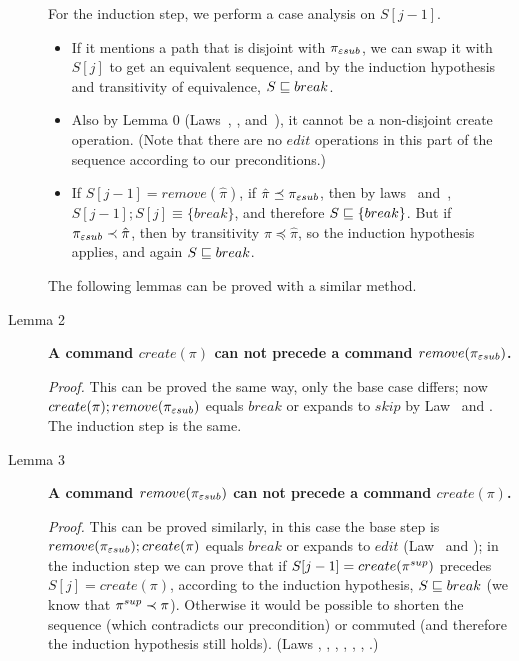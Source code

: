 \begin{description}
For the induction step, we perform a case analysis on \(S[j-1]\).
\begin{itemize}
\item
If it mentions a path that is disjoint with \(\pi_{\varepsilon sub}\),
we can swap it
with \(S[j]\) to get an equivalent sequence, and by the induction   
hypothesis and transitivity of equivalence, \(S\sqsubseteq break\).
\item
Also by Lemma 0 (Laws~\lawxvi, \lawxvii, and~\lawxxvii), it cannot be a
non-disjoint create operation. (Note that there are no \(edit\) operations
in this part of the sequence according to our preconditions.)
\item
If $S[j-1] =remove(\hat\pi)$, if $\hat\pi \preceq \pi_{\varepsilon sub}$, then by laws
\lawxxii~and~\lawxxiii, $S[j-1]; S[j] \equiv \{break\}$, and therefore 
$S\sqsubseteq\{break\}$.
But if $\pi_{\varepsilon sub} \prec \hat\pi$, then by transitivity $\pi \preceq
\hat\pi$, so the induction hypothesis applies, and again 
$S \sqsubseteq break$.
\end{itemize}

\begin{forrsi}
The following lemmas can be proved with a similar method.
\end{forrsi}
\item[Lemma 2]
{\bf A command \(create(\pi)\) can not precede a command  
\(remove(\pi_{\varepsilon sub})\).} 
\begin{notrsi}
\emph{Proof.} 
This can be proved the same way, only
the base case differs; now 
\(create(\pi); remove({\pi_{\varepsilon sub}})\) equals \(break\) or expands 
to \(skip\) by Law \lawxvi~and \lawxxvii.
The induction step is the same.
\end{notrsi}

\item[Lemma 3]
{\bf A command \(remove(\pi_{\varepsilon sub})\) can not precede a command
\(create(\pi)\).} 
\begin{notrsi}
\emph{Proof.} This can be proved similarly, in this 
case the base step is
\(remove(\pi_{\varepsilon sub}); create({\pi})\) equals \(break\) or
expands to \(edit\) (Law \lawxxi~and \lawxxviii);
in the induction step we can prove that if
\(S[j-1]=create(\pi^{sup})\) precedes \(S[j]=create(\pi)\), according to
the induction hypothesis, \(S\sqsubseteq break\) 
(we know that \(\pi^{sup}\prec\pi\)). Otherwise it would be possible to
shorten the sequence (which contradicts our precondition) or commuted (and therefore the induction hypothesis
still holds). (Laws \lawvii,
\lawviii, \lawxiv, \lawxv, \lawxx, \lawxxi, \lawxxviii.)
\end{notrsi}


\end{description}
